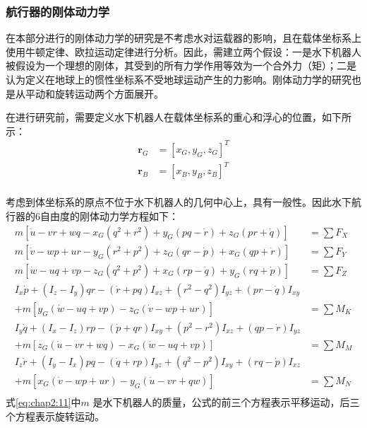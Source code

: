 \subsubsection{航行器的刚体动力学 }

在本部分进行的刚体动力学的研究是不考虑水对运载器的影响，且在载体坐标系上使用牛顿定律、欧拉运动定律进行分析。因此，需建立两个假设：一是水下机器人被假设为一个理想的刚体，其受到的所有力学作用等效为一个合外力（矩）；二是认为定义在地球上的惯性坐标系不受地球运动产生的力影响\cite{prestero2001verification}。刚体动力学的研究也是从平动和旋转运动两个方面展开。

在进行研究前，需要定义水下机器人在载体坐标系的重心和浮心的位置，如下所示：
\begin{equation}
\label{eq:chap2:10}
\begin{aligned}
{\bm{r}}_{G} &= [ x_G,  y_G,  z_G ]^T  \\
{\bm{r}}_{B} &= [ x_B,  y_B,  z_B ]^T  \\
\end{aligned}
\end{equation}

考虑到体坐标系的原点不位于水下机器人的几何中心上，具有一般性。因此水下航行器的6自由度的刚体动力学方程如下：
\begin{equation}
\label{eq:chap2:11}
 \begin{aligned}
 m\left[ {\dot u - vr + wq - {x_G}({q^2} + {r^2}) + {y_G}(pq - \dot r) + {z_G}(pr + \dot q)} \right] &= \sum {{F_X}}  \\
 m\left[ {\dot v - wp + ur - {y_G}({r^2} + {p^2}) + {z_G}(qr - \dot p) + {x_G}(qp + \dot r)} \right] &= \sum {{F_Y}}  \\
 m\left[ {\dot w - uq + vp - {z_G}({q^2} + {p^2}) + {x_G}(rp - \dot q) + {y_G}(rq + \dot p)} \right] &= \sum {{F_Z}}  \\
 {I_x}\dot p + ({I_z} - {I_y})qr -(\dot r + pq)I_{xz}+(r^2-q^2)I_{yz}+(pr-\dot q)I_{xy}\\
               + m[{y_G}(\dot w - uq + vp) - {z_G}(\dot v - wp + ur)] &= \sum {{M_K}}  \\
 {I_y}\dot q + ({I_x} - {I_z})rp -(\dot p + qr)I_{xy}+(p^2-r^2)I_{xz}+(qp-\dot r)I_{yz}\\
               + m[{z_G}(\dot u - vr + wq) - {x_G}(\dot w - uq + vp)] &= \sum {{M_M}}  \\
 {I_z}\dot r + ({I_y} - {I_x})pq -(\dot q + rp)I_{yz}+(q^2-p^2)I_{xy}+(rq-\dot p)I_{xz}\\
               + m[{x_G}(\dot v - wp + ur) - {y_G}(\dot u - vr + qw)] &= \sum {{M_N}}  \\
 \end{aligned}
 \end{equation}
式\ref{eq:chap2:11}中$m$ 是水下机器人的质量，公式的前三个方程表示平移运动，后三个方程表示旋转运动。

